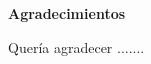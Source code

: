 \null \vfil \vfil

\begin{center}
\textbf{Agradecimientos}
\end{center}
\vspace{1cm}
Quería agradecer .......

\vfil \null
\newpage

